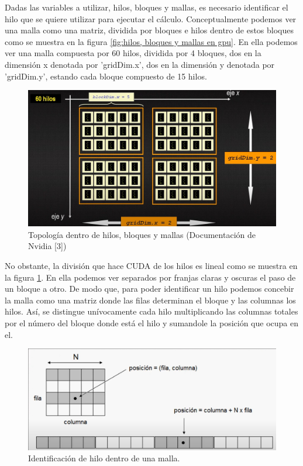 \documentclass[11pt,a4paper,twoside,pdf]{article}
\numberwithin{equation}{section}
\begin{document}
Dadas las variables a utilizar, hilos, bloques y mallas, es necesario identificar el hilo que se quiere utilizar para ejecutar el cálculo. Conceptualmente podemos ver una malla como una matriz, dividida por bloques e hilos dentro de estos bloques como se muestra en la figura \ref{fig:hilos, bloques y mallas en gpu}. En ella podemos ver una malla compuesta por 60 hilos, dividida por 4 bloques, dos en la dimensión x denotada por 'gridDim.x', dos en la dimensión y denotada por 'gridDim.y', estando cada bloque compuesto de 15 hilos.

\begin{figure}[h]
\centering
\includegraphics[width=10 cm]{Nvidia_Topologia_virtual.jpg}				
\caption{Topología dentro de hilos, bloques y mallas (Documentación de Nvidia [3]) }
\label{fig:topologia-hilos}
\end{figure}
\noindent

No obstante, la división que hace CUDA de los hilos es lineal como se muestra en la figura \ref{fig:topologia-hilos}. En ella podemos ver separados por franjas claras y oscuras el paso de un bloque a otro. De modo que, para poder identificar un hilo podemos concebir la malla como una matriz donde las filas determinan el bloque y las columnas los hilos. Así, se distingue unívocamente cada hilo multiplicando las columnas totales por el número del bloque donde está el hilo y sumandole la posición que ocupa en el.

\begin{figure}[h]
\centering
\includegraphics[width=10 cm]{Nvidia_Posicion_hilo.jpg}				
\caption{Identificación de hilo dentro de una malla.}
\label{fig:localizacion de hilos}
\end{figure}
\noindent
\end{document}
